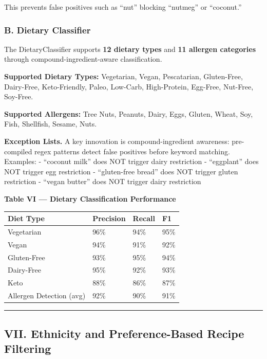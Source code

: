 \documentclass[10pt,conference,compsoc]{IEEEtran}
\begin{document}
This prevents false positives such as ``nut'' blocking ``nutmeg'' or
``coconut.''

\subsubsection{B. Dietary Classifier}\label{b.-dietary-classifier}

The DietaryClassifier supports \textbf{12 dietary types} and \textbf{11
allergen categories} through compound-ingredient-aware classification.

\textbf{Supported Dietary Types:} Vegetarian, Vegan, Pescatarian,
Gluten-Free, Dairy-Free, Keto-Friendly, Paleo, Low-Carb, High-Protein,
Egg-Free, Nut-Free, Soy-Free.

\textbf{Supported Allergens:} Tree Nuts, Peanuts, Dairy, Eggs, Gluten,
Wheat, Soy, Fish, Shellfish, Sesame, Nuts.

\textbf{Exception Lists.} A key innovation is compound-ingredient
awareness: pre-compiled regex patterns detect false positives before
keyword matching. Examples: - ``coconut milk'' does NOT trigger dairy
restriction - ``eggplant'' does NOT trigger egg restriction -
``gluten-free bread'' does NOT trigger gluten restriction - ``vegan
butter'' does NOT trigger dairy restriction

\textbf{Table VI --- Dietary Classification Performance}

\begin{longtable}[]{@{}llll@{}}
\toprule\noalign{}
Diet Type & Precision & Recall & F1 \\
\midrule\noalign{}
\endhead
\bottomrule\noalign{}
\endlastfoot
Vegetarian & 96\% & 94\% & 95\% \\
Vegan & 94\% & 91\% & 92\% \\
Gluten-Free & 93\% & 95\% & 94\% \\
Dairy-Free & 95\% & 92\% & 93\% \\
Keto & 88\% & 86\% & 87\% \\
Allergen Detection (avg) & 92\% & 90\% & 91\% \\
\end{longtable}

\begin{center}\rule{0.5\linewidth}{0.5pt}\end{center}

\subsection{VII. Ethnicity and Preference-Based Recipe
Filtering}\label{vii.-ethnicity-and-preference-based-recipe-filtering}
\end{document}
